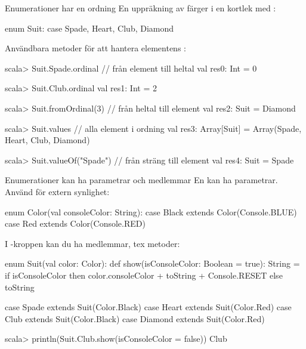 

\SlideFontSmall
\begin{Slide}{Enumerationer har en ordning}
En uppräkning av färger i en kortlek med :
\begin{Code}
enum Suit:
  case Spade, Heart, Club, Diamond 
\end{Code}
Användbara metoder för att hantera elementens :
\begin{REPLsmall}
scala> Suit.Spade.ordinal      // från element till heltal
val res0: Int = 0

scala> Suit.Club.ordinal
val res1: Int = 2

scala> Suit.fromOrdinal(3)    // från heltal till element
val res2: Suit = Diamond

scala> Suit.values            // alla element i ordning
val res3: Array[Suit] = Array(Spade, Heart, Club, Diamond)

scala> Suit.valueOf("Spade")  // från sträng till element
val res4: Suit = Spade
\end{REPLsmall}
\end{Slide}

\begin{Slide}{Enumerationer kan ha parametrar och medlemmar}
En  kan ha parametrar. Använd  för extern synlighet:  
\begin{Code}
enum Color(val consoleColor: String): 
  case Black extends Color(Console.BLUE)
  case Red   extends Color(Console.RED)
\end{Code}
I -kroppen kan du ha medlemmar, tex metoder:
\begin{Code}
enum Suit(val color: Color):
  def show(isConsoleColor: Boolean = true): String = 
    if isConsoleColor then color.consoleColor + toString + Console.RESET
    else toString

  case Spade   extends Suit(Color.Black)
  case Heart   extends Suit(Color.Red)
  case Club    extends Suit(Color.Black) 
  case Diamond extends Suit(Color.Red)
\end{Code}
\begin{REPLsmall}
scala> println(Suit.Club.show(isConsoleColor = false)) 
Club
\end{REPLsmall}
\end{Slide}



